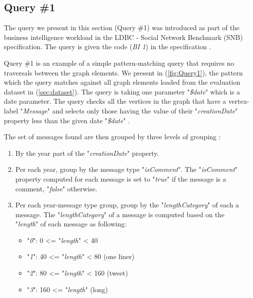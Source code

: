 {\subsection{Query \#1}
\label{subsec:qry1}

The query we present in this section (Query \#1) was introduced as part of the business intelligence workload in the LDBC - Social Network Benchmark (SNB) specification. The query is given the code (\textit{BI 1}) in the specification \cite{prat2017ldbc}. 

Query \#1 is an example of a simple pattern-matching query that requires no traversals between the graph elements. We present in (\ref{fig:Query1}), the pattern which the query matches against all graph elements loaded from the evaluation dataset in (\ref{sec:dataset}). The query is taking one parameter "\textit{\$date}" which is a date parameter. The query checks all the vertices in the graph that have a vertex-label "\textit{Message}" and selects only those having the value of their "\textit{creationDate}" property less than the given date "\textit{\$date}" \cite{prat2017ldbc}.

The set of messages found are then grouped by three levels of grouping \cite{prat2017ldbc}:

\begin{enumerate}

\item By the year part of the "\textit{creationDate}" property.
\item Per each year, group by the message type "\textit{isComment}". The "\textit{isComment}" property computed for each message is set to "\textit{true}" if the message is a comment, "\textit{false}" otherwise.
\item Per each year-message type group, group by the "\textit{lengthCategory}" of each a message. The "\textit{lengthCategory}" of a message is computed based on the "\textit{length}" of each message as following:
\begin{itemize}
    \item "\textit{0}": 0 <= "\textit{length}" < 40 
    \item "\textit{1}": 40 <= "\textit{length}" < 80 (one liner)
    \item "\textit{2}": 80 <= "\textit{length}" < 160 (tweet)
    \item "\textit{3}": 160 <= "\textit{length}" (long)\\
\end{itemize}


\end{enumerate}}
